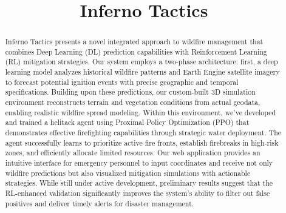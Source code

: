 \documentclass[conference]{IEEEtran}
\begin{document}
\title{Inferno Tactics\\
}

\author{
\and
{}
}

\maketitle

\begin{abstract}
Inferno Tactics presents a novel integrated approach to wildfire management that combines Deep Learning (DL) prediction capabilities with Reinforcement Learning (RL) mitigation strategies. Our system employs a two-phase architecture: first, a deep learning model analyzes historical wildfire patterns and Earth Engine satellite imagery to forecast potential ignition events with precise geographic and temporal specifications. Building upon these predictions, our custom-built 3D simulation environment reconstructs terrain and vegetation conditions from actual geodata, enabling realistic wildfire spread modeling. Within this environment, we've developed and trained a helitack agent using Proximal Policy Optimization (PPO) that demonstrates effective firefighting capabilities through strategic water deployment. The agent successfully learns to prioritize active fire fronts, establish firebreaks in high-risk zones, and efficiently allocate limited resources. Our web application provides an intuitive interface for emergency personnel to input coordinates and receive not only wildfire predictions but also visualized mitigation simulations with actionable strategies.
While still under active development, preliminary results suggest that the RL-enhanced validation significantly improves the system's ability to filter out false positives and deliver timely alerts for disaster management.
\end{abstract}
\end{document}
